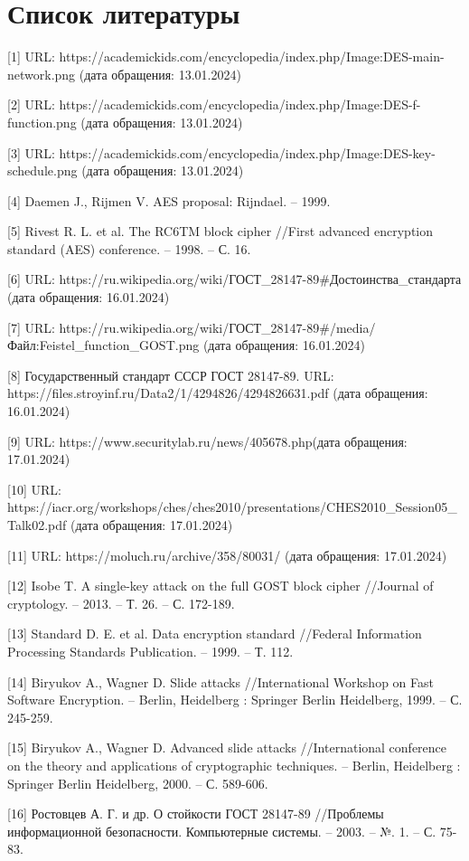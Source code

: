 \documentclass[colorthm]{./civarticle}
\begin{document}
\section{Список литературы}
[1] URL: https://academickids.com/encyclopedia/index.php/Image:DES-main-network.png (дата обращения: 13.01.2024)

[2] URL: https://academickids.com/encyclopedia/index.php/Image:DES-f-function.png (дата обращения: 13.01.2024)

[3] URL: https://academickids.com/encyclopedia/index.php/Image:DES-key-schedule.png (дата обращения: 13.01.2024)

[4] Daemen J., Rijmen V. AES proposal: Rijndael. – 1999.

[5] Rivest R. L. et al. The RC6TM block cipher //First advanced encryption standard (AES) conference. – 1998. – С. 16.

[6] URL: https://ru.wikipedia.org/wiki/ГОСТ\_28147-89#Достоинства\_стандарта (дата обращения: 16.01.2024)

[7] URL: https://ru.wikipedia.org/wiki/ГОСТ\_28147-89#/media/Файл:Feistel\_function\_GOST.png (дата обращения: 16.01.2024)

[8] Государственный стандарт СССР ГОСТ 28147-89. URL: https://files.stroyinf.ru/Data2/1/4294826/4294826631.pdf (дата обращения: 16.01.2024)

[9] URL: https://www.securitylab.ru/news/405678.php(дата обращения: 17.01.2024)

[10] URL: https://iacr.org/workshops/ches/ches2010/presentations/CHES2010\_Session05\_Talk02.pdf (дата обращения: 17.01.2024)
 
[11] URL: https://moluch.ru/archive/358/80031/ (дата обращения: 17.01.2024)

[12] Isobe T. A single-key attack on the full GOST block cipher //Journal of cryptology. – 2013. – Т. 26. – С. 172-189.

[13] Standard D. E. et al. Data encryption standard //Federal Information Processing Standards Publication. – 1999. – Т. 112.

[14] Biryukov A., Wagner D. Slide attacks //International Workshop on Fast Software Encryption. – Berlin, Heidelberg : Springer Berlin Heidelberg, 1999. – С. 245-259.

[15] Biryukov A., Wagner D. Advanced slide attacks //International conference on the theory and applications of cryptographic techniques. – Berlin, Heidelberg : Springer Berlin Heidelberg, 2000. – С. 589-606.

[16] Ростовцев А. Г. и др. О стойкости ГОСТ 28147-89 //Проблемы информационной безопасности. Компьютерные системы. – 2003. – №. 1. – С. 75-83.
\end{document}
